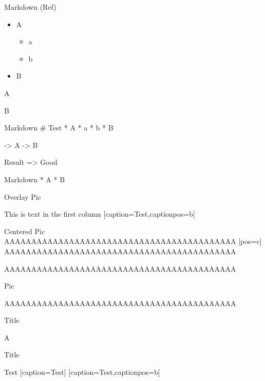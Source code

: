 \documentclass[english,notes]{beamer}
\begin{document}
\begin{frame}{Markdown (Ref)}
\begin{itemize}
    \item A
    \begin{itemize}
        \item a
        \item b
    \end{itemize}
    \item B
\end{itemize}
\begin{arrowlist}
    \item A
    \item B
\end{arrowlist}
\end{frame}

\begin{frame}{Markdown}
# Test %
* A
 * a
 * b
* B

-> A
-> B

Result => Good

\end{frame}

\disablemarkdown
\begin{frame}{Markdown}
* A
* B

\end{frame}
\enablemarkdown

\begin{frame}{Overlay Pic}
\begin{cols}
        This is text in the first column
        [caption=Test,captionpos=b]
    \end{cols}
\end{frame}

\begin{frame}{Centered Pic}
AAAAAAAAAAAAAAAAAAAAAAAAAAAAAAAAAAAAAAAAAAA
[pos=c]
AAAAAAAAAAAAAAAAAAAAAAAAAAAAAAAAAAAAAAAAAAA

AAAAAAAAAAAAAAAAAAAAAAAAAAAAAAAAAAAAAAAAAAA
\begin{center}
    Pic
\end{center}
AAAAAAAAAAAAAAAAAAAAAAAAAAAAAAAAAAAAAAAAAAA
\end{frame}

\begin{frame}{Title}

{\centering A \par}
\end{frame}

\begin{frame}{Title}
\begin{cols}
    Test
    [caption=Test]
    [caption=Test,captionpos=b]
\end{cols}
\end{frame}

\begin{frame}{~}
\end{frame}
\end{document}
